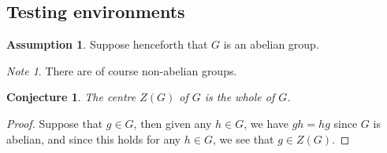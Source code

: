 \documentclass[a4paper,11pt]{article}
\theoremstyle{plain} %
\newtheorem{conj}{Conjecture}[subsection]
\theoremstyle{definition} %
\newtheorem{asmp}[defn]{Assumption}
\theoremstyle{remark} %
\newtheorem*{note}{Note}
\begin{document}
\subsection{Testing environments}

\begin{asmp}
Suppose henceforth that $G$ is an abelian group.
\end{asmp}

\begin{note}
There are of course non-abelian groups.
\end{note}

\begin{conj}
The centre $Z(G)$ of $G$ is the whole of $G$.
\end{conj}

\begin{proof}
Suppose that $g \in G$, then given any $h \in G$, we have $gh = hg$ since $G$ is abelian, and since this holds for any $h \in G$, we see that $g \in Z(G)$.
\end{proof}
\end{document}
